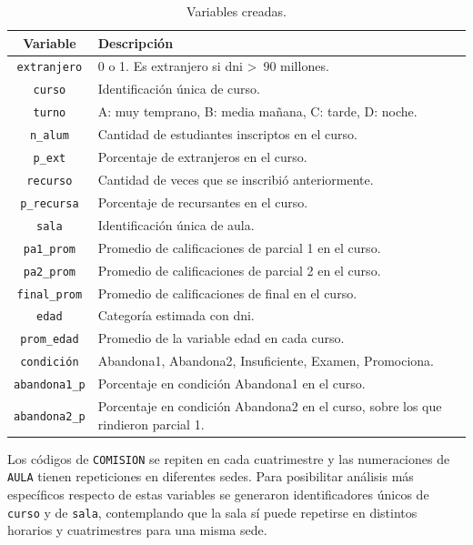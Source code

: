 \documentclass[a4paper,11pt,dvipsnames]{article}
\begin{document}
\begin{table}[!ht]
    \caption{Variables creadas.}
    \begin{center}
    \begin{tabular}{cl}
    \hline
    \textbf{Variable} & \textbf{Descripción}\\
    \hline
    \texttt{extranjero}  & 0 o 1. Es extranjero si dni >\, 90 millones.\\
    \texttt{curso} & Identificación única de curso.\\
    \texttt{turno} & A: muy temprano, B: media mañana, C: tarde, D: noche.\\
    \texttt{n\_alum} & Cantidad de estudiantes inscriptos en el curso.\\
    \texttt{p\_ext} & Porcentaje de extranjeros en el curso.\\
    \texttt{recurso} & Cantidad de veces que se inscribió anteriormente.\\
    \texttt{p\_recursa} & Porcentaje de recursantes en el curso.\\
    \texttt{sala} & Identificación única de aula.\\
    \texttt{pa1\_prom} & Promedio de calificaciones de parcial 1 en el curso.\\
    \texttt{pa2\_prom} & Promedio de calificaciones de parcial 2 en el curso.\\
    \texttt{final\_prom} & Promedio de calificaciones de final en el curso.\\
    \texttt{edad}        & Categoría estimada con dni.\\
    \texttt{prom\_edad}        & Promedio de la variable edad en cada curso.\\
    \texttt{condición} & Abandona1, Abandona2, Insuficiente, Examen, Promociona.\\
    \texttt{abandona1\_p} & Porcentaje en condición Abandona1 en el curso.\\
    \texttt{abandona2\_p} & Porcentaje en condición Abandona2 en el curso, sobre los que rindieron parcial 1.\\
    \hline
    \end{tabular}
    \label{tab:nuevas}
    \end{center}
\end{table}


Los códigos de \texttt{COMISION} se repiten en cada cuatrimestre y las numeraciones de \texttt{AULA} tienen repeticiones en diferentes sedes. Para posibilitar análisis más específicos respecto de estas variables se generaron identificadores únicos de \texttt{curso} y de \texttt{sala}, contemplando que la sala sí puede repetirse en distintos horarios y cuatrimestres para una misma sede.\par\medskip
\end{document}
